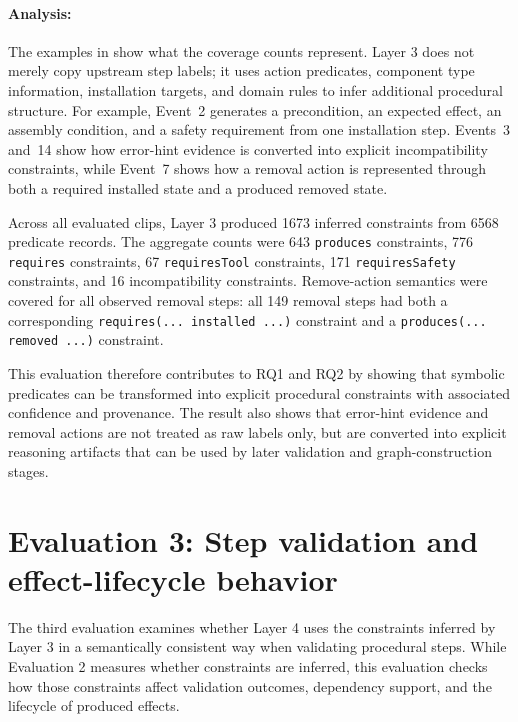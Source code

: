 \paragraph{Analysis:}
The examples in  show what the coverage
counts represent. Layer 3 does not merely copy upstream step labels; it uses action
predicates, component type information, installation targets, and domain rules to
infer additional procedural structure. For example, Event~2 generates a
precondition, an expected effect, an assembly condition, and a safety requirement
from one installation step. Events~3 and~14 show how error-hint evidence is
converted into explicit incompatibility constraints, while Event~7 shows how a
removal action is represented through both a required installed state and a
produced removed state.

Across all evaluated clips, Layer 3 produced 1673 inferred constraints from 6568
predicate records. The aggregate counts were 643 \texttt{produces} constraints,
776 \texttt{requires} constraints, 67 \texttt{requiresTool} constraints,
171 \texttt{requiresSafety} constraints, and 16 incompatibility constraints.
Remove-action semantics were covered for all observed removal steps: all 149
removal steps had both a corresponding \texttt{requires(... installed ...)}
constraint and a \texttt{produces(... removed ...)} constraint.

This evaluation therefore contributes to RQ1 and RQ2 by showing that symbolic
predicates can be transformed into explicit procedural constraints with associated
confidence and provenance. The result also shows that error-hint evidence and
removal actions are not treated as raw labels only, but are converted into explicit
reasoning artifacts that can be used by later validation and graph-construction
stages.


\section{Evaluation 3: Step validation and effect-lifecycle behavior}
\label{sec:evaluation-validation-behavior}

The third evaluation examines whether Layer 4 uses the constraints inferred by
Layer 3 in a semantically consistent way when validating procedural steps. While
Evaluation 2 measures whether constraints are inferred, this evaluation checks
how those constraints affect validation outcomes, dependency support, and the
lifecycle of produced effects.

